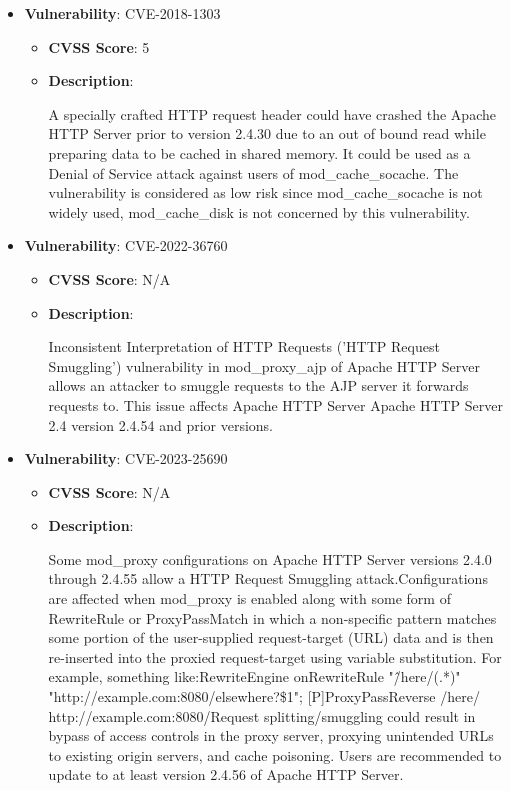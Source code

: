 \documentclass{article}
\begin{document}
\begin{itemize}
        \item \textbf{Vulnerability}: CVE-2018-1303
        \begin{itemize}
            \item \textbf{CVSS Score}:  5 
            \item \textbf{Description}:
            \parbox[t]{0.9\linewidth}{
                \ttfamily A specially crafted HTTP request header could have crashed the Apache HTTP Server prior to version 2.4.30 due to an out of bound read while preparing data to be cached in shared memory. It could be used as a Denial of Service attack against users of mod\_cache\_socache. The vulnerability is considered as low risk since mod\_cache\_socache is not widely used, mod\_cache\_disk is not concerned by this vulnerability.
            }
        \end{itemize}
    
        \item \textbf{Vulnerability}: CVE-2022-36760
        \begin{itemize}
            \item \textbf{CVSS Score}:  N/A 
            \item \textbf{Description}:
            \parbox[t]{0.9\linewidth}{
                \ttfamily Inconsistent Interpretation of HTTP Requests ('HTTP Request Smuggling') vulnerability in mod\_proxy\_ajp of Apache HTTP Server allows an attacker to smuggle requests to the AJP server it forwards requests to.  This issue affects Apache HTTP Server Apache HTTP Server 2.4 version 2.4.54 and prior versions.
            }
        \end{itemize}
    
        \item \textbf{Vulnerability}: CVE-2023-25690
        \begin{itemize}
            \item \textbf{CVSS Score}:  N/A 
            \item \textbf{Description}:
            \parbox[t]{0.9\linewidth}{
                \ttfamily Some mod\_proxy configurations on Apache HTTP Server versions 2.4.0 through 2.4.55 allow a HTTP Request Smuggling attack.Configurations are affected when mod\_proxy is enabled along with some form of RewriteRule or ProxyPassMatch in which a non-specific pattern matches some portion of the user-supplied request-target (URL) data and is then re-inserted into the proxied request-target using variable substitution. For example, something like:RewriteEngine onRewriteRule "\^/here/(.*)" "http://example.com:8080/elsewhere?\$1"; [P]ProxyPassReverse /here/ http://example.com:8080/Request splitting/smuggling could result in bypass of access controls in the proxy server, proxying unintended URLs to existing origin servers, and cache poisoning. Users are recommended to update to at least version 2.4.56 of Apache HTTP Server.
            }
        \end{itemize}
    

\end{itemize}
\end{document}
